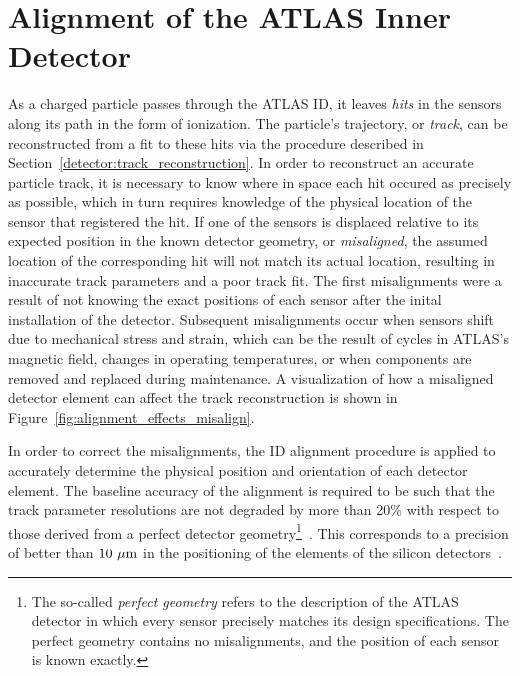 \chapter[Alignment of the ATLAS Inner Detector][Alignment of the ATLAS Inner Detector]{Alignment of the ATLAS Inner Detector}
\label{ch:alignment}

As a charged particle passes through the ATLAS ID, it leaves \emph{hits} in the sensors along its path in the form of ionization.
The particle's trajectory, or \emph{track}, can be reconstructed from a fit to these hits via the procedure described in Section~\ref{detector:track_reconstruction}.
In order to reconstruct an accurate particle track, it is necessary to know where in space each hit occured as precisely as possible, which in turn requires knowledge of the physical location of the sensor that registered the hit.
If one of the sensors is displaced relative to its expected position in the known detector geometry, or \emph{misaligned}, the assumed location of the corresponding hit will not match its actual location, resulting in inaccurate track parameters and a poor track fit.
The first misalignments were a result of not knowing the exact positions of each sensor after the inital installation of the detector.
Subsequent misalignments occur when sensors shift due to mechanical stress and strain, which can be the result of cycles in ATLAS's magnetic field, changes in operating temperatures, or when components are removed and replaced during maintenance.
A visualization of how a misaligned detector element can affect the track reconstruction is shown in Figure~\ref{fig:alignment_effects_misalign}. %

In order to correct the misalignments, the ID alignment procedure is applied to accurately determine the physical position and orientation of each detector element.
The baseline accuracy of the alignment is required to be such that the track parameter resolutions are not degraded by more than 20\% with respect to those derived from a perfect detector geometry\footnote{The so-called \emph{perfect geometry} refers to the description of the ATLAS detector in which every sensor precisely matches its design specifications.  The perfect geometry contains no misalignments, and the position of each sensor is known exactly.}~\cite{1997.id-tdr-1}.
This corresponds to a precision of better than $10~\mu\textrm{m}$ in the positioning of the elements of the silicon detectors~\cite{2011.alignment-7tev}.


